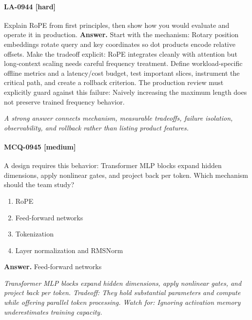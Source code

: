 \paragraph{LA-0944 [hard]} Explain RoPE from first principles, then show how you would evaluate and operate it in production.
\noindent\textbf{Answer.} Start with the mechanism: Rotary position embeddings rotate query and key coordinates so dot products encode relative offsets. Make the tradeoff explicit: RoPE integrates cleanly with attention but long-context scaling needs careful frequency treatment. Define workload-specific offline metrics and a latency/cost budget, test important slices, instrument the critical path, and create a rollback criterion. The production review must explicitly guard against this failure: Naively increasing the maximum length does not preserve trained frequency behavior.
\par\textit{A strong answer connects mechanism, measurable tradeoffs, failure isolation, observability, and rollback rather than listing product features.}
\paragraph{MCQ-0945 [medium]} A design requires this behavior: Transformer MLP blocks expand hidden dimensions, apply nonlinear gates, and project back per token. Which mechanism should the team study?
\begin{enumerate}[label=\Alph*.]
\item RoPE
\item Feed-forward networks
\item Tokenization
\item Layer normalization and RMSNorm
\end{enumerate}
\noindent\textbf{Answer.} Feed-forward networks
\par\textit{Transformer MLP blocks expand hidden dimensions, apply nonlinear gates, and project back per token. Tradeoff: They hold substantial parameters and compute while offering parallel token processing. Watch for: Ignoring activation memory underestimates training capacity.}
